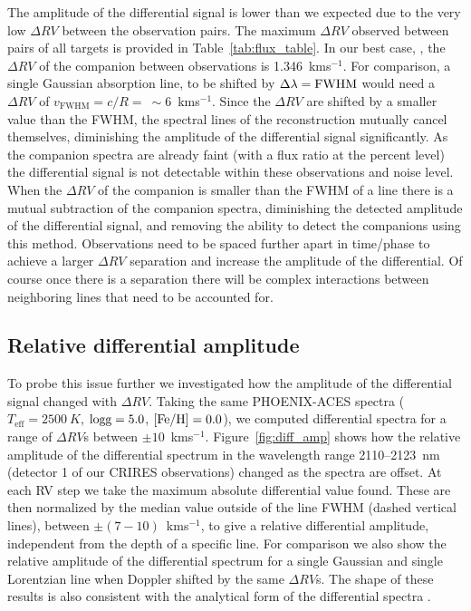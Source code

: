 The amplitude of the differential signal is lower than we expected due to the very low \(\Delta RV\) between the observation pairs. The maximum \(\Delta RV\) observed between pairs of all targets is provided in Table~\ref{tab:flux_table}.
In our best case, ,  the \(\Delta RV\) of the companion between observations is 1.346~kms\(^{-1}\). For comparison, a single Gaussian absorption line, to be shifted by \(\Delta\lambda = \rm FWHM\) would need a \(\Delta RV\) of \(v_{\textrm{FWHM}} = c/R =~\sim6\)~kms\(^{-1}\). Since the \(\Delta RV\) are shifted by a smaller value than the FWHM, the spectral lines of the reconstruction mutually cancel themselves, diminishing the amplitude of the differential signal significantly. As the companion spectra are already faint (with a flux ratio at the percent level) the differential signal is not detectable within these observations and noise level.
When the \(\Delta RV \) of the companion is smaller than the FWHM of a line there is a mutual subtraction of the companion spectra, diminishing the detected amplitude of the differential signal, and removing the ability to detect the companions using this method. Observations need to be spaced further apart in time/phase to achieve a larger \(\Delta RV\) separation and increase the amplitude of the differential. Of course once there is a separation there will be complex interactions between neighboring lines that need to be accounted for.

\subsection{Relative differential amplitude}
To probe this issue further we investigated how the amplitude of the differential signal changed with \(\Delta RV \). Taking the same PHOENIX-ACES spectra (\(T_{\textrm{eff}} = 2500~K \), \(\rm logg=5.0 \), \(\rm [Fe/H]=0.0 \)), we computed differential spectra for a range of \(\Delta RV\)s between \(\pm10\)~kms\(^{-1}\). Figure~\ref{fig:diff_amp} shows how the relative amplitude of the differential spectrum in the wavelength range 2110--2123~nm (detector 1 of our CRIRES observations) changed as the spectra are offset. At each RV step we take the maximum absolute differential value found. These are then normalized by the median value outside of the line FWHM (dashed vertical lines), between \(\pm(7-10)\)~kms\(^{-1}\), to give a relative differential amplitude, independent from the depth of a specific line. For comparison we also show the relative amplitude of the differential spectrum for a single Gaussian and single Lorentzian line when Doppler shifted by the same \(\Delta RV \)s. The shape of these results is also consistent with the analytical form of the differential spectra \citet[][eqn.~A.1]{ferluga_separating_1997}.

